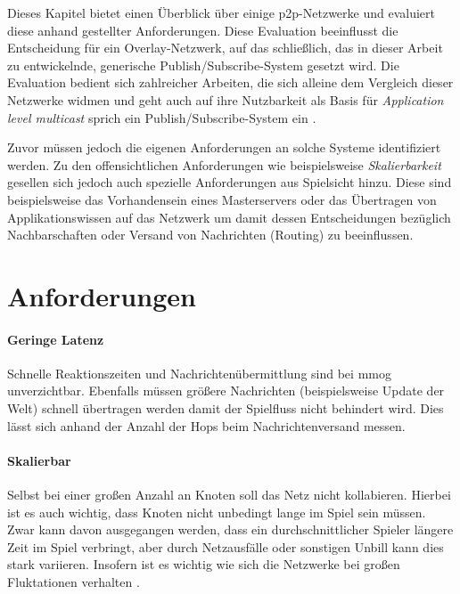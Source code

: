 Dieses Kapitel bietet einen Überblick über einige p2p-Netzwerke und evaluiert diese anhand gestellter Anforderungen. Diese Evaluation beeinflusst die Entscheidung für ein Overlay-Netzwerk, auf das schließlich, das in dieser Arbeit zu entwickelnde, generische Publish/Subscribe-System gesetzt wird. Die Evaluation bedient sich zahlreicher Arbeiten, die sich alleine dem Vergleich dieser Netzwerke widmen \cite{Lua2005Survey, Goetz2005, Li2004Comparing, Darlagiannis2006Peertopeer, Castro2002Secure, Bo2003PeertoPeer} und geht auch auf ihre Nutzbarkeit als Basis für \emph{Application level multicast} sprich ein Publish/Subscribe-System ein \cite{Hosseini2007Survey, Fahmy2007, Castro2003Evaluation, Ratnasamy2001}.

Zuvor müssen jedoch die eigenen Anforderungen an solche Systeme identifiziert werden. Zu den offensichtlichen Anforderungen wie beispielsweise \emph{Skalierbarkeit} gesellen sich jedoch auch spezielle Anforderungen aus Spielsicht hinzu. Diese sind beispielsweise das Vorhandensein eines Masterservers oder das Übertragen von Applikationswissen auf das Netzwerk um damit dessen Entscheidungen bezüglich Nachbarschaften oder Versand von Nachrichten (Routing) zu beeinflussen.

\section{Anforderungen}

\paragraph{Geringe Latenz} Schnelle Reaktionszeiten und Nachrichtenübermittlung sind bei \ac{mmog} unverzichtbar. Ebenfalls müssen größere Nachrichten (beispielsweise Update der Welt) schnell übertragen werden damit der Spielfluss nicht behindert wird. Dies lässt sich anhand der Anzahl der Hops beim Nachrichtenversand messen.

\paragraph{Skalierbar} Selbst bei einer großen Anzahl an Knoten soll das Netz nicht kollabieren. Hierbei ist es auch wichtig, dass Knoten nicht unbedingt lange im Spiel sein müssen. Zwar kann davon ausgegangen werden, dass ein durchschnittlicher Spieler längere Zeit im Spiel verbringt, aber durch Netzausfälle oder sonstigen Unbill kann dies stark variieren. Insofern ist es wichtig wie sich die Netzwerke bei großen Fluktationen verhalten \cite{Li2004Comparing}.

